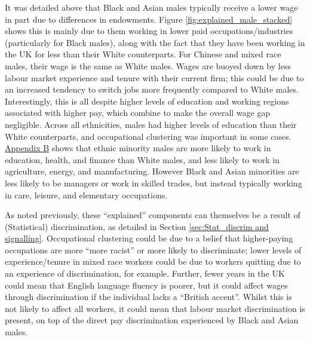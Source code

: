 \documentclass[class=article, crop=false]{standalone}
\begin{document}
It was detailed above that Black and Asian males typically receive a lower wage in part due to differences in endowments. Figure \ref{fig:explained_male_stacked} shows this is mainly due to them working in lower paid occupations/industries (particularly for Black males), along with the fact that they have been working in the UK for less than their White counterparts. For Chinese and mixed race males, their wage is the same as White males. Wages are buoyed down by less labour market experience and tenure with their current firm; this could be due to an increased tendency to switch jobs more frequently compared to White males. Interestingly, this is all despite higher levels of education and working regions associated with higher pay, which combine to make the overall wage gap negligible. Across all ethnicities, males had higher levels of education than their White counterparts, and occupational clustering was important in some cases. \hyperref[sec:appendixB]{Appendix B} shows that ethnic minority males are more likely to work in education, health, and finance than White males, and less likely to work in agriculture, energy, and manufacturing. However Black and Asian minorities are less likely to be managers or work in skilled trades, but instead typically working in care, leisure, and elementary occupations.

As noted previously, these \enquote{explained} components can themselves be a result of (Statistical) discrimination, as detailed in Section \ref{sec:Stat_discrim and signalling}. Occupational clustering could be due to a belief that higher-paying occupations are more \enquote{more racist} or more likely to discriminate; lower levels of experience/tenure in mixed race workers could be due to workers quitting due to an experience of discrimination, for example. Further, fewer years in the UK could mean that English language fluency is poorer, but it could affect wages through discrimination if the individual lacks a \enquote{British accent}. Whilst this is not likely to affect all workers, it could mean that labour market discrimination is present, on top of the direct pay discrimination experienced by Black and Asian males.
\end{document}

